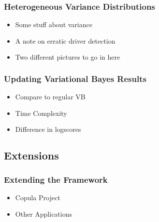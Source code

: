 \documentclass[11pt]{beamer}\usepackage[]{graphicx}\usepackage[]{color}
\begin{document}
\begin{frame}
\frametitle{Heterogeneous Variance Distributions}
\begin{itemize}
\item Some stuff about variance
\item A note on erratic driver detection
\item Two different pictures to go in here
\end{itemize}
\end{frame}

\begin{frame}
\frametitle{Updating Variational Bayes Results}
\begin{itemize}
\item Compare to regular VB
\item Time Complexity
\item Difference in logscores
\end{itemize}
\end{frame}

\begin{frame}
\section{Extensions}
\frametitle{Extending the Framework}
\begin{itemize}
\item Copula Project
\item Other Applications
\end{itemize}
\end{frame}
\end{document}
